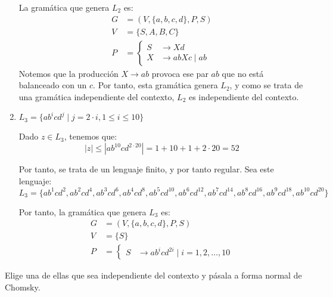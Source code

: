 \begin{ejercicio}
\begin{enumerate}
        La gramática que genera $L_2$ es:
        \begin{equation*}
            \begin{aligned}
                G &= (V,\{a,b,c,d\},P,S) \\
                V &= \{ S, A, B, C \} \\
                P &= \left\{
                    \begin{aligned}
                        S &\rightarrow Xd\\
                        X &\rightarrow abXc \mid ab
                    \end{aligned}
                \right.
            \end{aligned}
        \end{equation*}
        Notemos que la producción $X\rightarrow ab$ provoca ese par $ab$ que no está balanceado con un $c$. Por tanto, esta gramática genera $L_2$, y como se trata de una gramática independiente del contexto, $L_2$ es independiente del contexto.

        \item $L_3 = \{ ab^i cd^j \mid j = 2 \cdot i, 1 \leq i \leq 10 \}$
        
        Dado $z\in L_3$, tenemos que:
        \begin{equation*}
            |z|\leq |ab^{10}cd^{2\cdot 20}|=1+10+1+2\cdot 20=52
        \end{equation*}

        Por tanto, se trata de un lenguaje finito, y por tanto regular. Sea este lenguaje:
        \begin{equation*}
            L_3=\{ab^1cd^2, ab^2cd^4, ab^3cd^6, ab^4cd^8, ab^5cd^{10}, ab^6cd^{12}, ab^7cd^{14}, ab^8cd^{16}, ab^9cd^{18}, ab^{10}cd^{20}\}
        \end{equation*}

        Por tanto, la gramática que genera $L_3$ es:
        \begin{equation*}
            \begin{aligned}
                G &= (V,\{a,b,c,d\},P,S) \\
                V &= \{ S \} \\
                P &= \left\{
                    \begin{aligned}
                        S &\rightarrow ab^icd^{2i} \mid i=1,2,\ldots,10
                    \end{aligned}
                \right.
            \end{aligned}
        \end{equation*}
    \end{enumerate}
    Elige una de ellas que sea independiente del contexto y pásala a forma normal de Chomsky.\\


\end{ejercicio}
